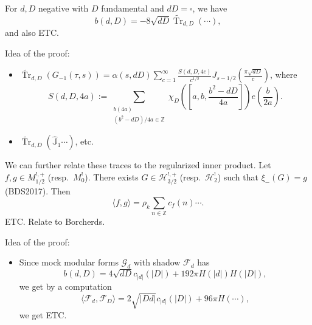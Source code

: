 \documentclass[reqno]{amsart} 
\begin{document}
\begin{theorem}[-, Kumar 2024]
  For $d, D$ negative with $D$ fundamental and $d D = \square$, we have
  \begin{equation*}
    b(d, D) = - 8 \sqrt{d D} \tilde{\operatorname{Tr}}_{d,D}(\dotsb),
  \end{equation*}
  and also ETC.
\end{theorem}

Idea of the proof:
\begin{itemize}
\item $\tilde{\operatorname{Tr}}_{d, D}(G_{- 1}(\tau, s)) = \alpha(s, d D) \sum_{c = 1}^\infty \frac{S(d, D, 4 c)}{c^{1/2}}J_{s - 1/2} \left( \frac{\pi \sqrt{d D}}{c} \right)$, where
  \begin{equation*}
    S(d, D, 4 a)
    := \sum_{
      \substack{
        b (4 a)  \\
        (b^2 - d D) / 4 a \in \mathbb{Z}        
      }
    }
    \chi_D \left( \left[ a, b, \frac{b^2 - d D}{4 a} \right] \right)
    e \left( \frac{b}{2 a} \right).
  \end{equation*}
\item $\tilde{\operatorname{Tr}}_{d, D}(\hat{\mathbb{J}}_1 \dotsb)$, etc.
\end{itemize}


We can further relate these traces to the regularized inner product.  Let $f, g \in M_{1/2}^{!, +}$ (resp.\ $M_0 ^!$).  There exists $G \in \mathcal{H}_{3/2}^{!, +}$ (resp.\ $\mathcal{H}_2^!$) such that $\xi_-(G) = g$ (BDS2017).  Then
\begin{equation*}
  \langle f, g \rangle = \rho_k \sum_{n \in \mathbb{Z}} c_f(n) \dotsb.
\end{equation*}
ETC.  Relate to Borcherds.

Idea of the proof:
\begin{itemize}
\item Since mock modular forms $\mathcal{G}_d$ with shadow $\mathcal{F}_d$ has
  \begin{equation*}
    b(d, D) = 4 \sqrt{d D} c_{\lvert d \rvert}(\lvert D \rvert) + 192 \pi H(\lvert d \rvert)
    H(\lvert D \rvert),
  \end{equation*}
  we get by a computation
  \begin{equation*}
    \langle \mathcal{F}_d, \mathcal{F}_D \rangle = 2 \sqrt{\lvert D d \rvert}
    c_{\lvert d \rvert}(\lvert D \rvert) + 96 \pi H(\dotsb),
  \end{equation*}
  we get ETC.
\end{itemize}
\end{document}
